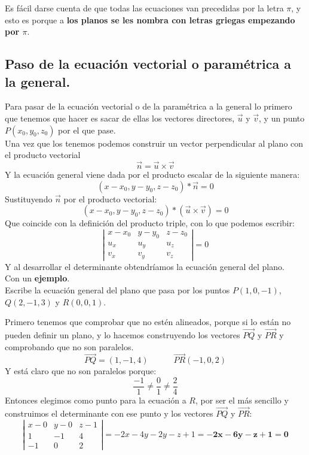 \documentclass[a4paper,11pt,answers]{exam}
\begin{document}
Es fácil darse cuenta de que todas las ecuaciones van precedidas por la letra $\pi$, y esto es porque a \textbf{los planos se les nombra con letras griegas empezando por $\pi$}.

\subsection{Paso de la ecuación vectorial o paramétrica a la general.}
Para pasar de la ecuación vectorial o de la paramétrica a la general lo primero que tenemos que hacer es sacar de ellas los vectores directores, $\vec{u}$ y $\vec{v}$, y un punto $P(x_0, y_0, z_0)$ por el que pase.\\
Una vez que los tenemos podemos construir un vector perpendicular al plano con el producto vectorial
\[\vec{n} = \vec{u} \times \vec{v}\]
Y la ecuación general viene dada por el producto escalar de la siguiente manera:
\[(x-x_0, y-y_0, z-z_0)*\vec{n} = 0\]
Sustituyendo $\vec n$ por el producto vectorial:
\[(x-x_0, y-y_0, z-z_0)*(\vec u \times \vec{v}) = 0\]
Que coincide con la definición del producto triple, con lo que podemos escribir:
\[\left|\begin{array}{ccc}
	x-x_0&y-y_0&z-z_0\\
	u_x&u_y&u_z\\
	v_x&v_y&v_z
\end{array}
\right| = 0\]
Y al desarrollar el determinante obtendríamos la ecuación general del plano.\\

Con un \textbf{ejemplo}.\\
Escribe la ecuación general del plano que pasa por los puntos $P(1,0,-1)$, $Q(2,-1,3)$ y $R(0, 0, 1)$.
\begin{solution}
	Primero tenemos que comprobar que no estén alineados, porque si lo están no pueden definir un plano, y lo hacemos construyendo los vectores $\overrightarrow{PQ}$ y $\overrightarrow{PR}$ y comprobando que no son paralelos.
	\[\overrightarrow{PQ} = (1, -1, 4)\quad\quad\quad\overrightarrow{PR} ( -1, 0, 2)\]
	Y está claro que no son paralelos porque:
	\[\frac{-1}{1}\neq \frac{0}{1} \neq \frac{2}{4}\]
	Entonces elegimos como punto para la ecuación a $R$, por ser el más sencillo y construimos el determinante con ese punto y los vectores $\overrightarrow{PQ}$ y $\overrightarrow{PR}$:
	\[\left|\begin{array}{rrr}
		x-0&y-0&z-1\\
		1&-1&4\\
		-1&0&2
	\end{array}\right| = -2x -4 y -2y -z + 1 = \boldsymbol{-2x -6y - z +1=0} \]
\end{solution}
\end{document}
